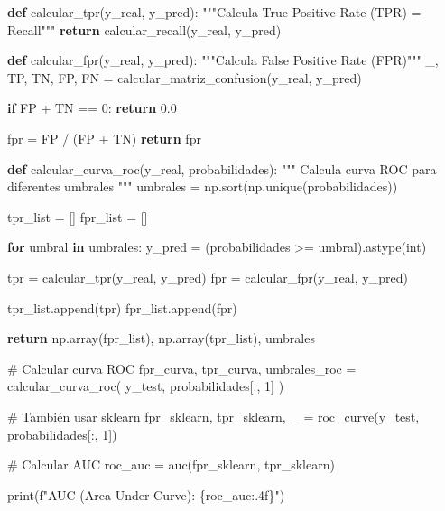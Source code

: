\documentclass[
  doc,
  floatsintext,
  longtable,
  a4paper,
  nolmodern,
  notxfonts,
  notimes,
  12pt,
  colorlinks=true,linkcolor=blue,citecolor=blue,urlcolor=blue]{apa7}
\newenvironment{Shaded}{\begin{snugshade}}{\end{snugshade}}
\newcommand{\BuiltInTok}[1]{\textcolor[rgb]{0.00,0.23,0.31}{#1}}
\newcommand{\CommentTok}[1]{\textcolor[rgb]{0.37,0.37,0.37}{#1}}
\newcommand{\ControlFlowTok}[1]{\textcolor[rgb]{0.00,0.23,0.31}{\textbf{#1}}}
\newcommand{\DecValTok}[1]{\textcolor[rgb]{0.68,0.00,0.00}{#1}}
\newcommand{\FloatTok}[1]{\textcolor[rgb]{0.68,0.00,0.00}{#1}}
\newcommand{\KeywordTok}[1]{\textcolor[rgb]{0.00,0.23,0.31}{\textbf{#1}}}
\newcommand{\NormalTok}[1]{\textcolor[rgb]{0.00,0.23,0.31}{#1}}
\newcommand{\OperatorTok}[1]{\textcolor[rgb]{0.37,0.37,0.37}{#1}}
\newcommand{\SpecialCharTok}[1]{\textcolor[rgb]{0.37,0.37,0.37}{#1}}
\newcommand{\SpecialStringTok}[1]{\textcolor[rgb]{0.13,0.47,0.30}{#1}}
\begin{document}
\begin{Shaded}
\begin{Highlighting}[]
\KeywordTok{def}\NormalTok{ calcular\_tpr(y\_real, y\_pred):}
    \CommentTok{"""Calcula True Positive Rate (TPR) = Recall"""}
    \ControlFlowTok{return}\NormalTok{ calcular\_recall(y\_real, y\_pred)}

\KeywordTok{def}\NormalTok{ calcular\_fpr(y\_real, y\_pred):}
    \CommentTok{"""Calcula False Positive Rate (FPR)"""}
\NormalTok{    \_, TP, TN, FP, FN }\OperatorTok{=}\NormalTok{ calcular\_matriz\_confusion(y\_real, y\_pred)}
    
    \ControlFlowTok{if}\NormalTok{ FP }\OperatorTok{+}\NormalTok{ TN }\OperatorTok{==} \DecValTok{0}\NormalTok{:}
        \ControlFlowTok{return} \FloatTok{0.0}
    
\NormalTok{    fpr }\OperatorTok{=}\NormalTok{ FP }\OperatorTok{/}\NormalTok{ (FP }\OperatorTok{+}\NormalTok{ TN)}
    \ControlFlowTok{return}\NormalTok{ fpr}

\KeywordTok{def}\NormalTok{ calcular\_curva\_roc(y\_real, probabilidades):}
    \CommentTok{"""}
\CommentTok{    Calcula curva ROC para diferentes umbrales}
\CommentTok{    """}
\NormalTok{    umbrales }\OperatorTok{=}\NormalTok{ np.sort(np.unique(probabilidades))}
    
\NormalTok{    tpr\_list }\OperatorTok{=}\NormalTok{ []}
\NormalTok{    fpr\_list }\OperatorTok{=}\NormalTok{ []}
    
    \ControlFlowTok{for}\NormalTok{ umbral }\KeywordTok{in}\NormalTok{ umbrales:}
\NormalTok{        y\_pred }\OperatorTok{=}\NormalTok{ (probabilidades }\OperatorTok{\textgreater{}=}\NormalTok{ umbral).astype(}\BuiltInTok{int}\NormalTok{)}
        
\NormalTok{        tpr }\OperatorTok{=}\NormalTok{ calcular\_tpr(y\_real, y\_pred)}
\NormalTok{        fpr }\OperatorTok{=}\NormalTok{ calcular\_fpr(y\_real, y\_pred)}
        
\NormalTok{        tpr\_list.append(tpr)}
\NormalTok{        fpr\_list.append(fpr)}
    
    \ControlFlowTok{return}\NormalTok{ np.array(fpr\_list), np.array(tpr\_list), umbrales}

\CommentTok{\# Calcular curva ROC}
\NormalTok{fpr\_curva, tpr\_curva, umbrales\_roc }\OperatorTok{=}\NormalTok{ calcular\_curva\_roc(}
\NormalTok{    y\_test, probabilidades[:, }\DecValTok{1}\NormalTok{]}
\NormalTok{)}

\CommentTok{\# También usar sklearn}
\NormalTok{fpr\_sklearn, tpr\_sklearn, \_ }\OperatorTok{=}\NormalTok{ roc\_curve(y\_test, probabilidades[:, }\DecValTok{1}\NormalTok{])}

\CommentTok{\# Calcular AUC}
\NormalTok{roc\_auc }\OperatorTok{=}\NormalTok{ auc(fpr\_sklearn, tpr\_sklearn)}

\BuiltInTok{print}\NormalTok{(}\SpecialStringTok{f"AUC (Area Under Curve): }\SpecialCharTok{\{}\NormalTok{roc\_auc}\SpecialCharTok{:.4f\}}\SpecialStringTok{"}\NormalTok{)}
\end{Highlighting}
\end{Shaded}
\end{document}
